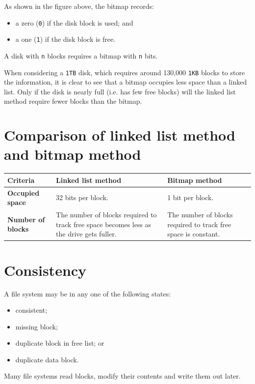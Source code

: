 \documentclass[a4paper]{systems-software}
\begin{document}
As shown in the figure above, the bitmap records:
\begin{itemize}
	\item a zero (\texttt{0}) if the disk block is used; and
	\item a one (\texttt{1}) if the disk block is free.
\end{itemize}

A disk with \texttt{n} blocks requires a bitmap with \texttt{n} bits. 

When considering a \texttt{1TB} disk, which requires around 130,000 \texttt{1KB} blocks to store the information, it is clear to see that a bitmap occupies less space than a linked list. Only if the disk is nearly full (i.e. has few free blocks) will the linked list method require fewer blocks than the bitmap.


\section*{Comparison of linked list method and bitmap method}

\begin{longtabu} to \textwidth {| X[1,l] | X[3,l] | X[3,l] |}
    \hline
    \textbf{Criteria} & \textbf{Linked list method} & \textbf{Bitmap method}
	\\ \hline
	\textbf{Occupied space} & 32 bits per block. & 1 bit per block.
	\\ \hline
	\textbf{Number of blocks} & The number of blocks required to track free space becomes less as the drive gets fuller. &
	The number of blocks required to track free space is constant.
	\\ \hline
\end{longtabu}


\newpage

\section{Consistency}

A file system may be in any one of the following states:
\begin{itemize}
	\item consistent;
	\item missing block;
	\item duplicate block in free list; or
	\item duplicate data block.
\end{itemize}

Many file systems read blocks, modify their contents and write them out later.
\end{document}
